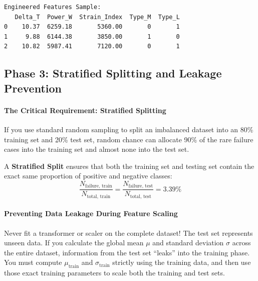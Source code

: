\begin{lstlisting}[style=outputstyle]
Engineered Features Sample:
   Delta_T  Power_W  Strain_Index  Type_M  Type_L
0    10.37  6259.18       5360.00       0       1
1     9.88  6144.38       3850.00       1       0
2    10.82  5987.41       7120.00       0       1
\end{lstlisting}

\subsection{Phase 3: Stratified Splitting and Leakage Prevention}

\paragraph{The Critical Requirement: Stratified Splitting}
If you use standard random sampling to split an imbalanced dataset into an 80\% training set and 20\% test set, random chance can allocate 90\% of the rare failure cases into the training set and almost none into the test set. 

A \textbf{Stratified Split} ensures that both the training set and testing set contain the exact same proportion of positive and negative classes:
\begin{equation}
\frac{N_{\text{failure, train}}}{N_{\text{total, train}}} = \frac{N_{\text{failure, test}}}{N_{\text{total, test}}} = 3.39\%\label{eq:stratification}
\end{equation}

\paragraph{Preventing Data Leakage During Feature Scaling}
\begin{keyidea}
Never fit a transformer or scaler on the complete dataset! The test set represents unseen data. If you calculate the global mean $\mu$ and standard deviation $\sigma$ across the entire dataset, information from the test set ``leaks'' into the training phase. You must compute $\mu_{\text{train}}$ and $\sigma_{\text{train}}$ strictly using the training data, and then use those exact training parameters to scale both the training and test sets.
\end{keyidea}

